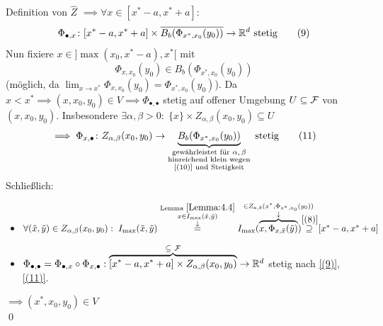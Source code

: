 \documentclass[a4paper]{article}
\begin{document}
\begin{Beweis}
Definition von $\hat{Z}$ $\implies \forall x\in [x^*-a,x^*+a]$:
\[\Phi_{\bullet,x}\colon [x^*-a,x^*+a]\times\overline{B_b(\Phi_{x^*,x_0}(y_0))}\to\mathbb R^d\text{ stetig}\tag{$9$}\label{(9)}\]
Nun fixiere $x\in]\max(x_0,x^*-a),x^*[$ mit 
\[\Phi_{x,x_0}(y_0)\in B_b(\Phi_{x^*,x_0}(y_0))\tag{$10$}\label{(10)}\]
(möglich, da $\lim_{x\to x^*}\Phi_{x,x_0}(y_0)=\Phi_{x^*,x_0}(y_0)$). Da $x<x^*\implies (x,x_0,y_0)\in V\implies \Phi_{\bullet,\bullet}$ stetig auf offener Umgebung $U\subseteq \operatorname{\mathcal{F}}$ von $(x,x_0,y_0)$. Insbesondere $\exists \alpha,\beta>0:\;\{x\}\times Z_{\alpha,\beta}(x_0,y_0)\subseteq U$
\[\implies \Phi_{x,\bullet}\colon Z_{\alpha,\beta}(x_0,y_0)\to \underbrace{B_b(\Phi_{x^*,x_0}(y_0))}_{\substack{\text{gewährleistet für $\alpha,\beta$}\\ \text{hinreichend klein wegen}\\\text{\eqref{(10)} und Stetigkeit}}}\text{ stetig}\tag{$11$}\label{(11)}\]
Schließlich:
\needspace{3.5cm}
\begin{itemize}
\item $\forall (\tilde{x},\tilde{y})\in Z_{\alpha,\beta}(x_0,y_0):\;I_{\max}(\tilde{x},\tilde{y})
\overset{
\substack{
\text{Lemma }\ref{Lemma:4.4}\\
x\in I_{\max}(\tilde{x},\tilde{y})\\\downarrow
}}{=}
I_{\max}(\overbrace{x,\Phi_{x,\tilde{x}}(\tilde{y})}^{\ms{\in Z_{a,b}(x^*,\Phi_{x^*,x_0}(y_0))\\\downarrow}})
\overset{\eqref{(8)}}{{\supseteq}_{\mathord{\tikz[baseline=(B.base), inner sep = 0pt]{\node (B){};}}}}[x^*-a,x^*+a]$\vspace{0.3cm}
\item $\Phi_{\bullet,\bullet}=\Phi_{\bullet,x}\circ\Phi_{x,\bullet}:\overbrace{[x^*-a,x^*+a]\times Z_{\alpha,\beta}(x_0,y_0)}^{{\subseteq}^{\mathord{\tikz[baseline=(C.base), inner sep = 0pt]{\node (C){};}}} \FF}\to \RR^d$ stetig nach \eqref{(9)}, \eqref{(11)}.
\end{itemize}
\nopagebreak
{}
$\implies (x^*,x_0,y_0)\in V$ \lightning\\\qed
\begin{center}
\end{center}
\end{Beweis}
\end{document}
